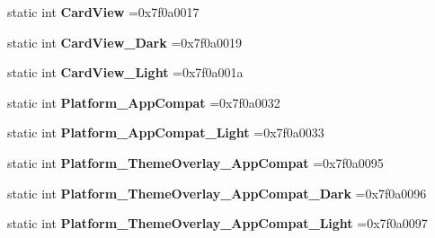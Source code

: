 \begin{DoxyCompactItemize}
\mbox{\label{classandroid_1_1support_1_1graphics_1_1drawable_1_1R_1_1style_a3b70a796d1fa51f45937466ca9bb3989}} 
static int {\bfseries Card\+View} =0x7f0a0017
\item 
\mbox{\label{classandroid_1_1support_1_1graphics_1_1drawable_1_1R_1_1style_a028d931031b8c1523afe22df80938d70}} 
static int {\bfseries Card\+View\+\_\+\+Dark} =0x7f0a0019
\item 
\mbox{\label{classandroid_1_1support_1_1graphics_1_1drawable_1_1R_1_1style_ab26aa738ea663cf58eadfd891c4e8500}} 
static int {\bfseries Card\+View\+\_\+\+Light} =0x7f0a001a
\item 
\mbox{\label{classandroid_1_1support_1_1graphics_1_1drawable_1_1R_1_1style_ad9d14ca9170d8d1b48745dd9111d8425}} 
static int {\bfseries Platform\+\_\+\+App\+Compat} =0x7f0a0032
\item 
\mbox{\label{classandroid_1_1support_1_1graphics_1_1drawable_1_1R_1_1style_a693a32baab27070d5d8c297b108558d7}} 
static int {\bfseries Platform\+\_\+\+App\+Compat\+\_\+\+Light} =0x7f0a0033
\item 
\mbox{\label{classandroid_1_1support_1_1graphics_1_1drawable_1_1R_1_1style_ae3dd0a4c48b6f2579a8f2b2e3ae74da6}} 
static int {\bfseries Platform\+\_\+\+Theme\+Overlay\+\_\+\+App\+Compat} =0x7f0a0095
\item 
\mbox{\label{classandroid_1_1support_1_1graphics_1_1drawable_1_1R_1_1style_a4c90638352eb0afd1babb55a66cd15ab}} 
static int {\bfseries Platform\+\_\+\+Theme\+Overlay\+\_\+\+App\+Compat\+\_\+\+Dark} =0x7f0a0096
\item 
\mbox{\label{classandroid_1_1support_1_1graphics_1_1drawable_1_1R_1_1style_a1c859e1095782480e96f010cec186f70}} 
static int {\bfseries Platform\+\_\+\+Theme\+Overlay\+\_\+\+App\+Compat\+\_\+\+Light} =0x7f0a0097

\end{DoxyCompactItemize}
